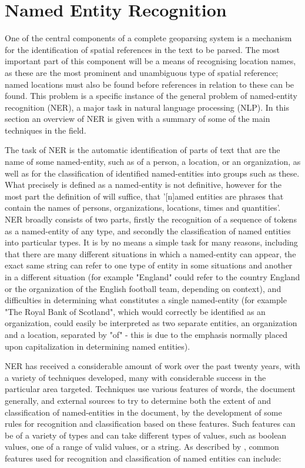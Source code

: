 \documentclass[12pt, a4paper]{report}
\begin{document}
\section{Named Entity Recognition}
\label{sec_ner}

One of the central components of a complete geoparsing system is a mechanism for the identification of spatial references in the text to be parsed. The most important part of this component will be a means of recognising location names, as these are the most prominent and unambiguous type of spatial reference; named locations must also be found before references in relation to these can be found. This problem is a specific instance of the general problem of named-entity recognition (NER), a major task in natural language processing (NLP). In this section an overview of NER is given with a summary of some of the main techniques in the field.

The task of NER is the automatic identification of parts of text that are the name of some named-entity, such as of a person, a location, or an organization, as well as for the classification of identified named-entities into groups such as these. What precisely is defined as a named-entity is not definitive, however for the most part the definition of \citet{conll2002} will suffice, that '[n]amed entities are phrases that contain the names of persons, organizations, locations, times and quantities'. NER broadly consists of two parts, firstly the recognition of a sequence of tokens as a named-entity of any type, and secondly the classification of named entities into particular types. It is by no means a simple task for many reasons, including that there are many different situations in which a named-entity can appear, the exact same string can refer to one type of entity in some situations and another in a different situation (for example "England" could refer to the country England or the organization of the English football team, depending on context), and difficulties in determining what constitutes a single named-entity (for example "The Royal Bank of Scotland", which would correctly be identified as an organization, could easily be interpreted as two separate entities, an organization and a location, separated by "of" - this is due to the emphasis normally placed upon capitalization in determining named entities).

NER has received a considerable amount of work over the past twenty years, with a variety of techniques developed, many with considerable success in the particular area targeted. Techniques use various features of words, the document generally, and external sources to try to determine both the extent of and classification of named-entities in the document, by the development of some rules for recognition and classification based on these features. Such features can be of a variety of types and can take different types of values, such as boolean values, one of a range of valid values, or a string. As described by \citet{nadeau2009}, common features used for recognition and classification of named entities can include:
\end{document}
